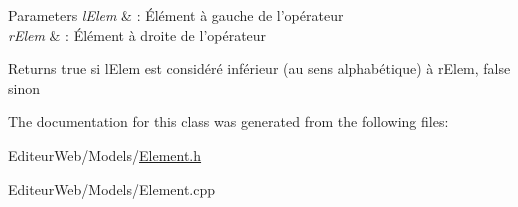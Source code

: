 \begin{DoxyParams}{Parameters}
{\em lElem} & : Élément à gauche de l'opérateur \\
\hline
{\em rElem} & : Élément à droite de l'opérateur \\
\hline
\end{DoxyParams}
\begin{DoxyReturn}{Returns}
true si lElem est considéré inférieur (au sens alphabétique) à rElem, false sinon 
\end{DoxyReturn}


The documentation for this class was generated from the following files:\begin{DoxyCompactItemize}
\item 
EditeurWeb/Models/\hyperlink{_element_8h}{Element.h}\item 
EditeurWeb/Models/Element.cpp\end{DoxyCompactItemize}
